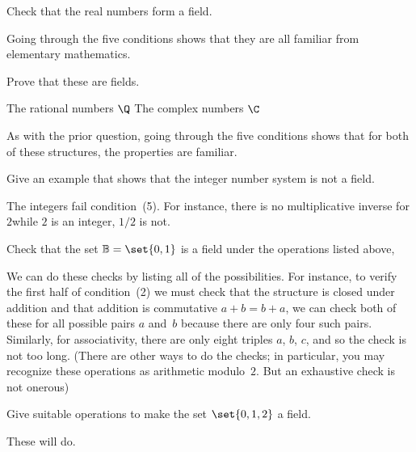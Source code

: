 \begin{exercises}
  \item 
    Check that the real numbers form a field.
    \begin{answer}
      Going through the five conditions shows that they are all familiar from 
      elementary mathematics.
    \end{answer}
  \item 
    Prove that these are fields.
    \begin{exparts*}
       \partsitem The rational numbers $\Q$
       \partsitem The complex numbers  $\C$
    \end{exparts*}
    \begin{answer}
      As with the prior question, going through the five conditions 
      shows that
      for both of these structures, 
      the properties are familiar.
    \end{answer}
  \item 
     Give an example that shows that the integer number system
     is not a field.
     \begin{answer}
       The integers fail condition~(5).
       For instance, there is no multiplicative inverse for $2$\Dash while
       $2$ is an integer, $1/2$ is not.
     \end{answer}
  \item \label{exer:BinField} 
     Check that the set $\mathbb{B}=\set{0,1}$ is a field under the operations 
     listed above, 
     \begin{answer}
       We can do these checks by listing all of the possibilities.
       For instance, to verify the first half of condition~(2) we must check
       that the structure is closed under addition and that addition
       is commutative  $a+b=b+a$,
       we can check both of these 
       for all possible pairs $a$ and~$b$ because there
       are only four such pairs.  
       Similarly, for associativity, there are only eight triples $a$, $b$,
       $c$, and so the check is not too long.
       (There are other ways to do the checks; in particular, you may 
       recognize these operations as arithmetic modulo~$2$.
       But an exhaustive check is not onerous)
     \end{answer}
  \item 
     Give suitable operations to make the set $\set{0,1,2}$
     a field.     
     \begin{answer}
       These will do.
       \begin{center}
          \begin{tabular}{c|ccc}

\end{tabular}
\end{center}
\end{answer}
\end{exercises}
